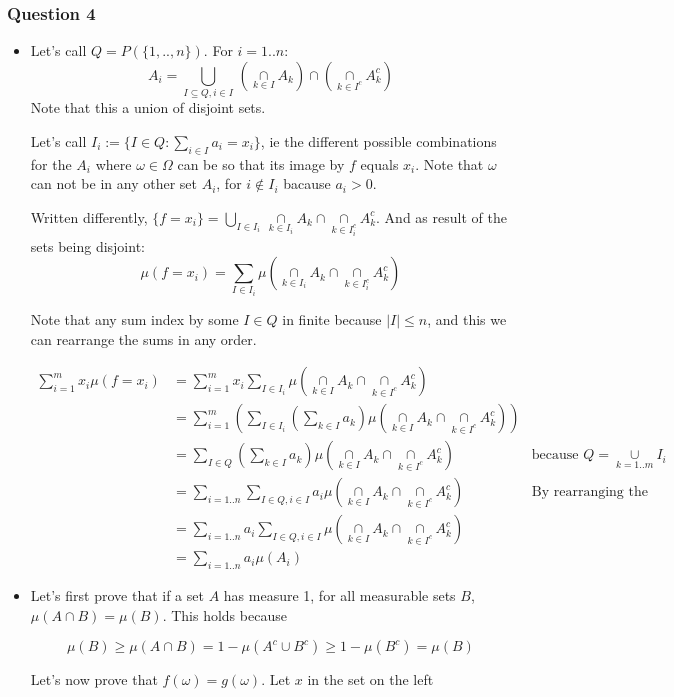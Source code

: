 \documentclass[12pt]{article}
\newcommand{\Q}[1]{\subsubsection*{Question #1}}
\newcommand{\union}[1]{\underset{#1}{\cup} }
\newcommand{\bigunion}[1]{\underset{#1}{\bigcup} \, }
\newcommand{\inter}[1]{\underset{#1}{\cap} }
\begin{document}
\Q{4}

\begin{itemize}

\item
Let's call $Q = P(\{1,..,n\})$. For $i = 1 .. n$:
$$A_i = \bigunion{I \subseteq Q, i \in I} (\inter{k \in I} A_k) \inter{} (\inter{k \in I^c} A_k^c) $$
Note that this a union of disjoint sets.


Let's call $I_i := \{ I \in Q: \sum_{i \in I} a_i = x_i\}$, ie the different possible combinations for the $A_i$ where $\omega \in \Omega$ can be so that its image by $f$ equals $x_i$. Note that $\omega$ can not be  in any other set $A_i$, for $i \not \in I_i$ bacause $a_i > 0$.


Written differently, $\{ f = x_i \} = \bigunion{I \in I_i} \inter{k \in I_i} A_k \inter{} \inter{k \in I_i^c} A_k^c$. And as result of the sets being disjoint: 
$$ \mu(f = x_i) = \sum_{I \in I_i} \mu(\inter{k \in I_i} A_k \inter{} \inter{k \in I_i^c} A_k^c)$$


Note that any sum index by some $I \in Q$ in finite because $|I| \leq n$, and this we can rearrange the sums in any order.

\begin{align*}
\sum_{i=1}^m x_i \mu(f = x_i) 
&= \sum_{i=1}^m x_i \sum_{I \in I_i} \mu(\inter{k \in I} A_k \inter{} \inter{k \in I^c} A_k^c) \\
&= \sum_{i=1}^m  \left(\sum_{I \in I_i} (\sum_{k \in I} a_k) \mu(\inter{k \in I} A_k \inter{} \inter{k \in I^c} A_k^c)\right) \\
&= \sum_{I \in Q} (\sum_{k \in I} a_k) \mu(\inter{k \in I} A_k \inter{} \inter{k \in I^c} A_k^c) 
& \text{because $Q = \union{k=1..m} I_i$} \\
&= \sum_{i=1..n} \sum_{I \in Q, i \in I} a_i \mu(\inter{k \in I} A_k \inter{} \inter{k \in I^c} A_k^c) 
& \text{By rearranging the sum}\\
&= \sum_{i=1..n} a_i \sum_{I \in Q, i \in I}  \mu(\inter{k \in I} A_k \inter{} \inter{k \in I^c} A_k^c) \\
&= \sum_{i=1..n} a_i \mu(A_i)
\end{align*}

\item
Let's first prove that if a set $A$ has measure 1, for all measurable sets $B$, $\mu(A \inter{} B) = \mu(B)$. This holds because 

$$\mu(B) \geq \mu(A \inter{} B) = 1 - \mu(A^c \union{} B^c) \geq 1 - \mu(B^c) = \mu(B)$$


Let's now prove that $f(\omega) = g(\omega)$.
Let $x$ in the set on the left


\end{itemize}
\end{document}
